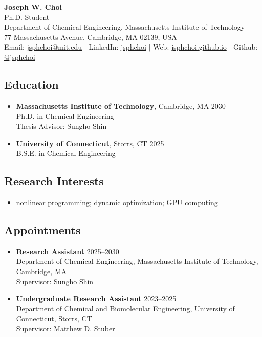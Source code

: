 \documentclass[letterpaper, 11pt]{article}
\begin{document}
\thispagestyle{empty}
\begin{center}
  {\bf\Large Joseph W. Choi}\\[.25em]
  Ph.D. Student\\
  Department of Chemical Engineering, Massachusetts Institute of Technology
  \\
  77 Massachusetts Avenue, Cambridge, MA 02139, USA
  \\
  Email: \href{mailto:jsphchoi@mit.edu}{jsphchoi@mit.edu} $|$ LinkedIn: \href{https://www.linkedin.com/in/jsphchoi/}{jsphchoi} $|$ Web: \href{https://jsphchoi.github.io}{jsphchoi.github.io} $|$ Github: \href{https://github.com/jsphchoi}{@jsphchoi}
\end{center}

\subsection*{Education}
\begin{itemize}[itemsep=1pt, parsep=0pt,leftmargin=*]
\item[]
  {\bf Massachusetts Institute of Technology}, Cambridge, MA \hfill 2030\\
  {Ph.D. in Chemical Engineering}\\
  Thesis Advisor: Sungho Shin
\item[]
  {\bf University of Connecticut}, Storrs, CT \hfill 2025\\
  {B.S.E. in Chemical Engineering}
\end{itemize}

\subsection*{Research Interests}
\begin{itemize}[itemsep=1pt, parsep=0pt,leftmargin=*]
\item[] nonlinear programming; dynamic optimization; GPU computing
\end{itemize}

\subsection*{Appointments}
\begin{itemize}[itemsep=1pt, parsep=0pt,leftmargin=*]
\item[] {\bf Research Assistant} \hfill 2025--2030\\
  Department of Chemical Engineering,
  Massachusetts Institute of Technology, Cambridge, MA\\
  Supervisor: Sungho Shin
\item[] {\bf Undergraduate Research Assistant} \hfill 2023--2025\\
  Department of Chemical and Biomolecular Engineering,
  University of Connecticut, Storrs, CT\\
  Supervisor: Matthew D. Stuber
\end{itemize}
\end{document}

